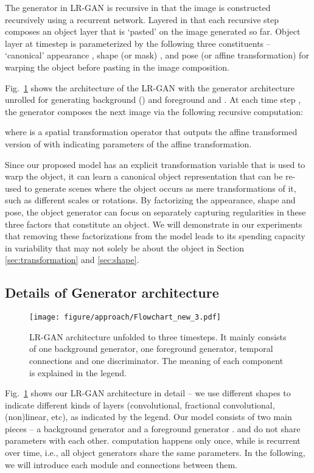 \documentclass{article} \usepackage{iclr2017_conference,times}
\begin{document}
The generator in LR-GAN is recursive in that the image is constructed recursively 
using a recurrent network. Layered in that each recursive step composes an object layer that is 
`pasted' on the image generated so far. Object layer at timestep  is parameterized by the following three constituents -- `canonical' appearance , shape (or mask) , and pose (or affine transformation)  for warping the object before pasting in the image composition. 

Fig.~\ref{Fig_FlowChart} shows the  architecture of the LR-GAN with the generator architecture 
unrolled for generating background  () 
and foreground  and . At each time step , the generator composes the next image  via the following recursive computation: 

where  is a spatial transformation operator that outputs the affine transformed version of  with  indicating parameters of the affine transformation.

Since our proposed model has an explicit transformation variable  that is used to warp the object, it can learn a canonical object representation that can be re-used to generate scenes where the object occurs as mere transformations of it, such as different scales or rotations. By factorizing the appearance, shape and pose, the object generator can focus on separately capturing regularities in these three factors that constitute an object. We will demonstrate in our experiments that removing these factorizations from the model leads to its spending capacity in variability that may not solely be about the object in Section \ref{sec:transformation} and \ref{sec:shape}.


\subsection{Details of Generator architecture}
\vspace{-5pt}
\begin{figure}[t]
\center
\texttt{[image: figure/approach/Flowchart\_new\_3.pdf]}
\caption{LR-GAN architecture unfolded to three timesteps. It mainly consists of one background generator, one foreground generator, temporal connections and one discriminator. The meaning of each component is explained in the legend.} 
\label{Fig_FlowChart}
\end{figure}

Fig.~\ref{Fig_FlowChart} shows our LR-GAN architecture in detail -- we use different shapes to indicate different kinds of layers (convolutional, fractional convolutional, (non)linear, etc), 
as indicated by the legend. Our model consists of two main pieces -- a background generator  and a foreground generator .  and  do not share parameters with each other.  computation happens only once, while  is recurrent over time, i.e., all object generators share the same parameters. In the following, we will introduce each module and connections between them. 
\end{document}
